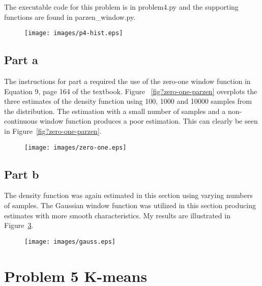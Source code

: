\documentclass{report}
\begin{document}
The executable code for this problem is in problem4.py and the
supporting functions are found in parzen\_window.py.

\begin{figure}
\centering
  \texttt{[image: images/p4-hist.eps]}
  \label{fig:p4-hist}
\end{figure}

\subsection*{Part a}
The instructions for part a required the use of the zero-one window
function in Equation 9, page 164 of the textbook.  Figure
~\ref{fig?zero-one-parzen} overplots the three estimates of the
density function using 100, 1000 and 10000 samples from the
distribution.  The estimation with a small number of samples
and a non-continuous window function produces a poor estimation.
This can clearly be seen in Figure~\ref{fig?zero-one-parzen}.

\begin{figure}
\centering
  \texttt{[image: images/zero-one.eps]}
  \label{fig:zero-one-parzen}
\end{figure}

\subsection*{Part b}
The density function was again estimated in this section using varying
numbers of samples.  The Gaussian window function was utilized in this
section producing estimates with more smooth characteristics.  My
results are illustrated in Figure~\ref{fig:gauss-parzen}.
\begin{figure}
\centering
  \texttt{[image: images/gauss.eps]}
  \label{fig:gauss-parzen}
\end{figure}

\section*{Problem 5 K-means}
\end{document}
